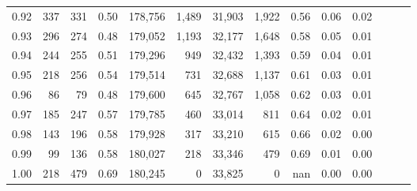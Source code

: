 \begin{tabular}{rrrrrrrrrrrrrr}
0.92 &    337 &  331 &  0.50 &  178,756 &    1,489 &  31,903 &   1,922 &  0.56 &  0.06 &      0.02 \\
0.93 &    296 &  274 &  0.48 &  179,052 &    1,193 &  32,177 &   1,648 &  0.58 &  0.05 &      0.01 \\
0.94 &    244 &  255 &  0.51 &  179,296 &      949 &  32,432 &   1,393 &  0.59 &  0.04 &      0.01 \\
0.95 &    218 &  256 &  0.54 &  179,514 &      731 &  32,688 &   1,137 &  0.61 &  0.03 &      0.01 \\
0.96 &     86 &   79 &  0.48 &  179,600 &      645 &  32,767 &   1,058 &  0.62 &  0.03 &      0.01 \\
0.97 &    185 &  247 &  0.57 &  179,785 &      460 &  33,014 &     811 &  0.64 &  0.02 &      0.01 \\
0.98 &    143 &  196 &  0.58 &  179,928 &      317 &  33,210 &     615 &  0.66 &  0.02 &      0.00 \\
0.99 &     99 &  136 &  0.58 &  180,027 &      218 &  33,346 &     479 &  0.69 &  0.01 &      0.00 \\
1.00 &    218 &  479 &  0.69 &  180,245 &        0 &  33,825 &       0 &   nan &  0.00 &      0.00 \\
\bottomrule
\end{tabular}
